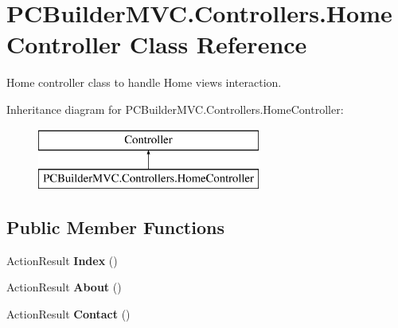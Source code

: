 \hypertarget{class_p_c_builder_m_v_c_1_1_controllers_1_1_home_controller}{}\section{P\+C\+Builder\+M\+V\+C.\+Controllers.\+Home\+Controller Class Reference}
\label{class_p_c_builder_m_v_c_1_1_controllers_1_1_home_controller}


Home controller class to handle Home views interaction.  


Inheritance diagram for P\+C\+Builder\+M\+V\+C.\+Controllers.\+Home\+Controller\+:\begin{figure}[H]
\begin{center}
\leavevmode
\includegraphics[height=2.000000cm]{class_p_c_builder_m_v_c_1_1_controllers_1_1_home_controller}
\end{center}
\end{figure}
\subsection*{Public Member Functions}
\begin{DoxyCompactItemize}
\item 
Action\+Result {\bfseries Index} ()\hypertarget{class_p_c_builder_m_v_c_1_1_controllers_1_1_home_controller_a801d32817dc4293c2f8e33c691ada19f}{}\label{class_p_c_builder_m_v_c_1_1_controllers_1_1_home_controller_a801d32817dc4293c2f8e33c691ada19f}

\item 
Action\+Result {\bfseries About} ()\hypertarget{class_p_c_builder_m_v_c_1_1_controllers_1_1_home_controller_a8890fc72d17ba59929e1dea4020a93a8}{}\label{class_p_c_builder_m_v_c_1_1_controllers_1_1_home_controller_a8890fc72d17ba59929e1dea4020a93a8}

\item 
Action\+Result {\bfseries Contact} ()\hypertarget{class_p_c_builder_m_v_c_1_1_controllers_1_1_home_controller_aede11cb947edcbe91f408801ad549d89}{}\label{class_p_c_builder_m_v_c_1_1_controllers_1_1_home_controller_aede11cb947edcbe91f408801ad549d89}

\end{DoxyCompactItemize}


